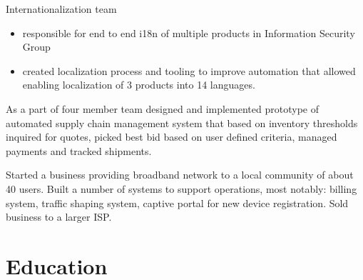 \documentclass[11pt,a4paper,roman]{moderncv}       %
\begin{document}
Internationalization team

\begin{itemize}
    \item responsible for end to end i18n of multiple products in Information Security Group
    \item created localization process and tooling to improve automation that allowed enabling localization of 3 products into 14 languages.
\end{itemize}

\vspace{16pt}


As a part of four member team designed and implemented prototype of automated supply chain management system that based on inventory thresholds inquired for quotes, picked best bid based on user defined criteria, managed payments and tracked shipments.

\vspace{16pt}


Started a business providing broadband network to a local community of about 40 users. Built a number of systems to support operations, most notably: billing system, traffic shaping system, captive portal for new device registration. 
Sold business to a larger ISP.

\section{Education}

\vspace{5pt}






\end{document}
